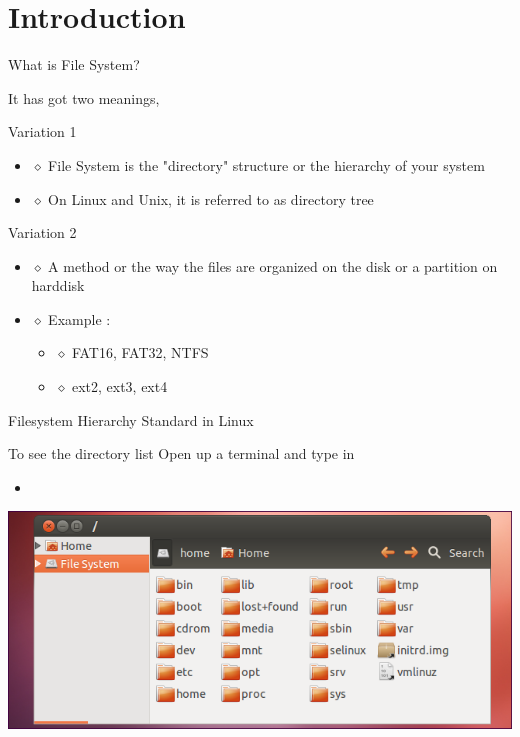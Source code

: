 \documentclass{beamer}
\newcommand{\insertcode}[2]{\begin{itemize}\item[]\end{itemize}} %
\begin{document}
\section{Introduction}
\begin{frame}{What is File System?}

It has got two meanings, 

\begin{block}{Variation 1}
\begin{itemize}
\item[] $\diamond$ File System is the "directory" structure or the hierarchy of your system
\item[] $\diamond$ On Linux and Unix, it is referred to as directory tree
\end{itemize}

\end{block}
\pause
\begin{block}{Variation 2}
\begin{itemize}
\item[] $\diamond$ A method or the way the files are organized on the disk or a partition on harddisk
\item[] $\diamond$ Example :
   \begin{itemize}
   \item[] $\diamond$ FAT16, FAT32, NTFS
   \item[] $\diamond$ ext2, ext3, ext4
   \end{itemize}
\end{itemize}
\end{block}

\end{frame}

\begin{frame}{Filesystem Hierarchy Standard in Linux}

\begin{block}{To see the directory list}
Open up a terminal and type in
\insertcode{scripts/filesystem_hier.sh}{}
\centering
\includegraphics[scale=0.6]{filesystem_list}
\end{block}

\end{frame}
\end{document}
